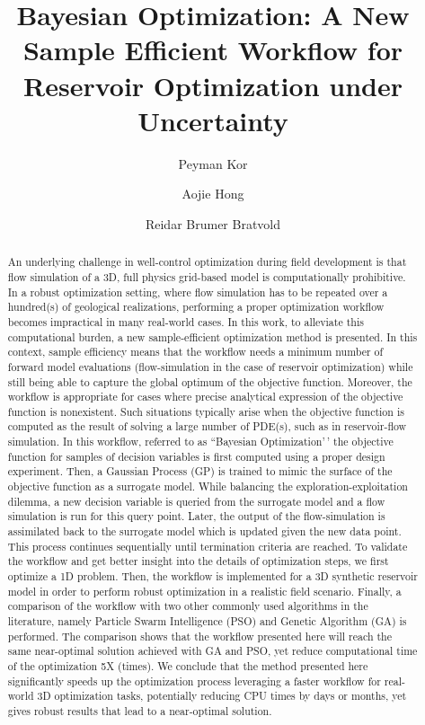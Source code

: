 \documentclass[]{elsarticle} %
\begin{document}
\begin{frontmatter}

  \title{Bayesian Optimization: A New Sample Efficient Workflow for Reservoir Optimization under Uncertainty}
    \author[a]{Peyman Kor}
  
    \author[a]{Aojie Hong}
  
    \author[a]{Reidar Brumer Bratvold}
  
      \address[a]{Energy Resources Department, University of Stavanger, Stavanger, Norway}
  
  \begin{abstract}
  \doublespacing An underlying challenge in well-control optimization during field development is that flow simulation of a 3D, full physics grid-based model is computationally prohibitive. In a robust optimization setting, where flow simulation has to be repeated over a hundred(s) of geological realizations, performing a proper optimization workflow becomes impractical in many real-world cases. In this work, to alleviate this computational burden, a new sample-efficient optimization method is presented. In this context, sample efficiency means that the workflow needs a minimum number of forward model evaluations (flow-simulation in the case of reservoir optimization) while still being able to capture the global optimum of the objective function. Moreover, the workflow is appropriate for cases where precise analytical expression of the objective function is nonexistent. Such situations typically arise when the objective function is computed as the result of solving a large number of PDE(s), such as in reservoir-flow simulation. In this workflow, referred to as ``Bayesian Optimization'\,' the objective function for samples of decision variables is first computed using a proper design experiment. Then, a Gaussian Process (GP) is trained to mimic the surface of the objective function as a surrogate model. While balancing the exploration-exploitation dilemma, a new decision variable is queried from the surrogate model and a flow simulation is run for this query point. Later, the output of the flow-simulation is assimilated back to the surrogate model which is updated given the new data point. This process continues sequentially until termination criteria are reached. To validate the workflow and get better insight into the details of optimization steps, we first optimize a 1D problem. Then, the workflow is implemented for a 3D synthetic reservoir model in order to perform robust optimization in a realistic field scenario. Finally, a comparison of the workflow with two other commonly used algorithms in the literature, namely Particle Swarm Intelligence (PSO) and Genetic Algorithm (GA) is performed. The comparison shows that the workflow presented here will reach the same near-optimal solution achieved with GA and PSO, yet reduce computational time of the optimization 5X (times). We conclude that the method presented here significantly speeds up the optimization process leveraging a faster workflow for real-world 3D optimization tasks, potentially reducing CPU times by days or months, yet gives robust results that lead to a near-optimal solution.

\end{abstract}
\end{frontmatter}
\end{document}
